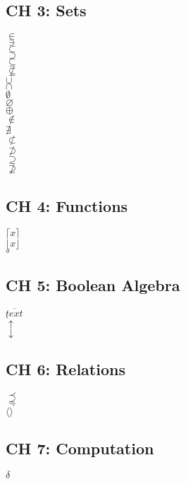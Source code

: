 \documentclass[letterpaper]{article}
\begin{document}
\begin{multicols*}{2}
\subsection*{CH 3: Sets}
$\in$\\
$\ni$\\
$\subset$\\
$\supset$\\
$\subseteq$\\
$\nsubseteq$\\
$\cup$\\
$\cap$\\
$\emptyset$\\
$\varnothing$\\
$\oplus$\\
$\notin$\\
$\nexists$\\
$\not\subset$\\
$\not\supset$\\
$\supseteq$\\
$\nsupseteq$\\

\subsection*{CH 4: Functions}
$\lceil x \rceil$\\
$\lfloor x \rfloor$\\
$\circ$\\

\subsection*{CH 5: Boolean Algebra}
$\overline{text}$\\
$\cdot$\\
$\uparrow$\\
$\downarrow$\\

\subsection*{CH 6: Relations}
$\prec$\\
$\preceq$\\
$\langle \rangle$\\

\subsection*{CH 7: Computation}
$\delta$

\end{multicols*}
\end{document}
